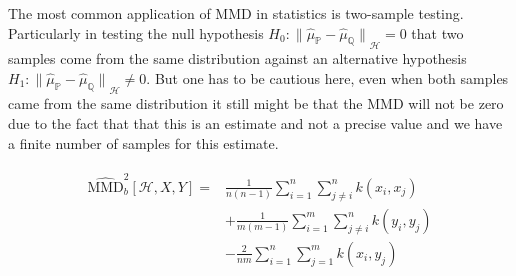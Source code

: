 The most common application of MMD in statistics is two-sample testing. Particularly in testing the null hypothesis $H_0:{\lVert \widehat{\mu}_{\mathds{P}} - \widehat{\mu}_{\mathds{Q}} \rVert }_{\mathscr{H}}=0$ that two samples come from the same distribution against an alternative hypothesis $H_1:{\lVert \widehat{\mu}_{\mathds{P}} - \widehat{\mu}_{\mathds{Q}} \rVert }_{\mathscr{H}}\neq0$. But one has to be cautious here, even when both samples came from the same distribution it still might be that the MMD will not be zero due to the fact that that this is an estimate and not a precise value and we have a finite number of samples for this estimate.

\begin{align}
    \begin{split}
        \widehat{\textrm{MMD}}_b^2 [\mathscr{H}, X, Y] = & \frac{1}{n(n-1)} \sum^n_{i=1}\sum^n_{j \neq i}k(x_i, x_j)\\
        & + \frac{1}{m(m-1)} \sum^m_{i=1}\sum^n_{j \neq i}k(y_i, y_j) \\
        & -\frac{2}{nm} \sum^n_{i=1}\sum^m_{j=1}k(x_i, y_j)
    \end{split}
\end{align}